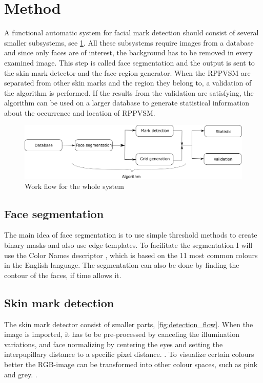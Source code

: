 \section{Method} \label{method}
A functional automatic system for facial mark detection should consist of several smaller subsystems, see \cref{fig:system_flow}. All these subsystems require images from a database and since only faces are of interest, the background has to be removed in every examined image. This step is called face segmentation and the output is sent to the skin mark detector and the face region generator. When the RPPVSM are separated from other skin marks and the region they belong to, a validation of the algorithm is performed. If the results from the validation are satisfying, the algorithm can be used on a larger database to generate statistical information about the occurrence and location of RPPVSM.  

\begin{figure}[H]
	\centering
	\includegraphics[width=1.0\linewidth]{"../bilder/system_flow"}
	\caption{Work flow for the whole system}
	\label{fig:system_flow}
\end{figure}

\subsection{Face segmentation}

The main idea of face segmentation is to use simple threshold methods to create binary masks and also use edge templates. \cite{face_segmentation_skin} To facilitate the segmentation I will use the Color Names descriptor \cite{11_colours}, which is based on the 11 most common colours in the English language. The segmentation can also be done by finding the contour of the faces, if time allows it.  

\subsection{Skin mark detection}

The skin mark detector consist of smaller parts, \cref{fig:detection_flow}. When the image is imported, it has to be pre-processed by canceling the illumination variations, and face normalizing by centering the eyes and setting the interpupillary distance to a specific pixel distance. \cite{automatic_detector_2015}. To visualize certain colours better the RGB-image can be transformed into other colour spaces, such as pink and grey. \cite{11_colours}. 

